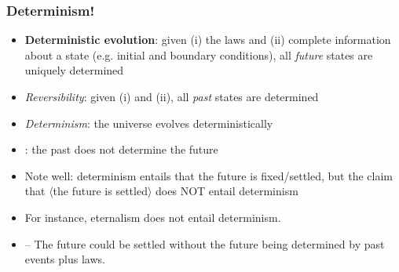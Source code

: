 \begin{frame}
\frametitle{Determinism!}

\begin{itemize}[<+->]

\item \textbf{Deterministic evolution}: given (i) the laws and (ii) complete information about a state (e.g. initial and boundary conditions), all \textit{future} states are uniquely determined 

\item \textit{Reversibility}: given (i) and (ii), all \textit{past} states are determined  

\item \emph{Determinism}: the universe evolves deterministically 


\item {}: the past does not determine the future 

\item Note well: determinism entails that the future is fixed/settled, but the claim that $\langle$the future is settled$\rangle$ does NOT entail determinism

\item For instance, eternalism does not entail determinism. 
\item[] -- The future could be settled without the future being determined by past events plus laws.

\end{itemize}
\end{frame}

